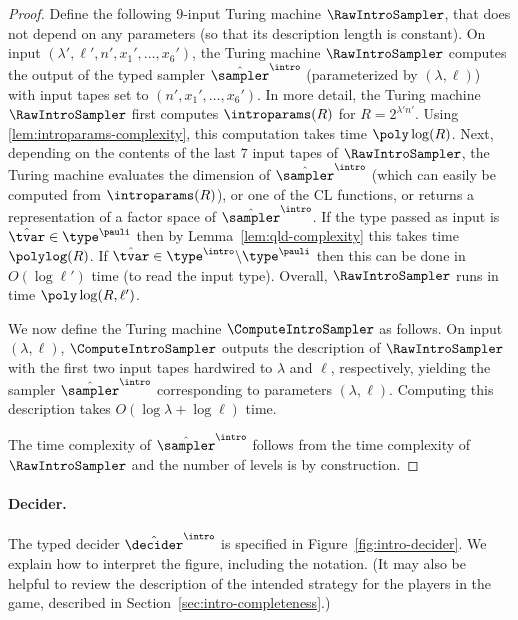\begin{proof}
  Define the following $9$-input Turing machine
  $\RawIntroSampler$, that does not depend on any parameters (so that its description length is constant). 
  On input $(\lambda', \ell', n', x_1', \ldots, x_6')$, the Turing machine $\RawIntroSampler$
  computes the output of the typed sampler $\tsint$ (parameterized by
  $(\lambda, \ell)$) with input tapes set to $(n', x_1', \ldots, x_6')$.
  In more detail, the Turing machine $\RawIntroSampler$ first computes
  $\introparams(R)$ for $R= 2^{\lambda' n'}$.
  Using \cref{lem:introparams-complexity}, this computation takes time
  $\poly\log(R)$.
  Next, depending on the contents of the last $7$ input tapes of
  $\RawIntroSampler$, the Turing machine evaluates the dimension of
  $\tsint$ (which can easily be computed from $\introparams(R)$), or
  one of the CL functions, or returns a representation of a factor space of
  $\tsint$.
  If the type passed as input is $\hat{\tvar} \in \type^\pauli$ then by
  Lemma~\ref{lem:qld-complexity} this takes time $\polylog(R)$.
  If $\hat{\tvar} \in \type^\intro\backslash\type^\pauli$ then this can be done
  in $O(\log \ell')$ time (to read the input type).
  Overall, $\RawIntroSampler$ runs in time $\poly\log(R,\ell')$.
  
  We now define the Turing machine $\ComputeIntroSampler$ as follows.
  On input $(\lambda,\ell)$, $\ComputeIntroSampler$ outputs the description of
  $\RawIntroSampler$ with the first two input tapes hardwired to $\lambda$ and
  $\ell$, respectively, yielding the sampler $\tsint$ corresponding to
  parameters $(\lambda,\ell)$.
  Computing this description takes $O(\log \lambda + \log \ell)$ time.
  
  The time complexity of $\tsint$ follows from the time complexity of
  $\RawIntroSampler$ and the number of levels is by construction.
\end{proof}

\paragraph{Decider.}
The typed decider $\tdint$ is specified in
Figure~\ref{fig:intro-decider}.
We explain how to interpret the figure, including the notation.
(It may also be helpful to review the description of the intended strategy for
the players in the game, described in Section~\ref{sec:intro-completeness}.)


